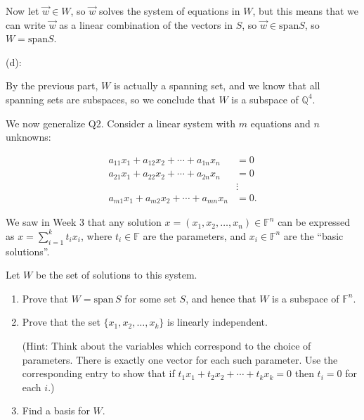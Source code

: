\documentclass{article}
\theoremstyle{plain} %
\numberwithin{thm}{section} %
\theoremstyle{definition}
\begin{document}
\begin{question}{2}
        Now let \(\vec{w} \in W\), so \(\vec{w}\) solves the system of equations in \(W\), but this means that we can write \(\vec{w}\) as a linear combination of the vectors in \(S\), so \(\vec{w} \in \mathrm{span} S\), so \(W = \mathrm{span} S\).

        \medskip

        (d):

        By the previous part, \(W\) is actually a spanning set, and we know that all spanning sets are subspaces, so we conclude that \(W\) is a subspace of \(\mathbb{Q}^4\).
    \end{question}
    \newpage
    \begin{question}{3}
        We now generalize Q2. Consider a linear system with \( m \) equations and \( n \) unknowns:
        
        \[
        \begin{aligned}
        a_{11}x_1 + a_{12}x_2 + \cdots + a_{1n}x_n &= 0 \\
        a_{21}x_1 + a_{22}x_2 + \cdots + a_{2n}x_n &= 0 \\
        &\vdots \\
        a_{m1}x_1 + a_{m2}x_2 + \cdots + a_{mn}x_n &= 0.
        \end{aligned}
        \]
        
        We saw in Week 3 that any solution \( x = (x_1, x_2, \ldots, x_n) \in \mathbb{F}^n \) can be expressed as \( x = \sum_{i=1}^{k} t_i x_i \), where \( t_i \in \mathbb{F} \) are the parameters, and \( x_i \in \mathbb{F}^n \) are the “basic solutions”.
        
        Let \( W \) be the set of solutions to this system.
        
        \begin{enumerate}[label=(\alph*)]
            \item Prove that \( W = \text{span} \, S \) for some set \( S \), and hence that \( W \) is a subspace of \( \mathbb{F}^n \).
            \item Prove that the set \(\{x_1, x_2, \ldots, x_k\}\) is linearly independent.
            
            (Hint: Think about the variables which correspond to the choice of parameters. There is exactly one vector for each such parameter. Use the corresponding entry to show that if \( t_1 x_1 + t_2 x_2 + \cdots + t_k x_k = 0 \) then \( t_i = 0 \) for each \( i \).)
            
            \item Find a basis for \( W \).
        \end{enumerate}


\end{question}
\end{document}
